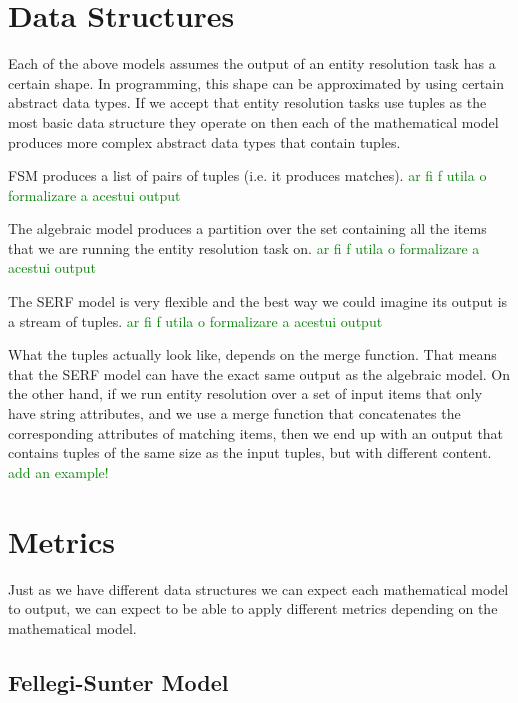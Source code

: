 \documentclass[11pt]{article}
\begin{document}
    \section{Data Structures}\label{section:data-structures}

    Each of the above models assumes the output of an entity resolution task has a certain shape. In programming, this shape can be approximated by using certain abstract data types. If we accept that entity resolution tasks use tuples as the most basic data structure they operate on then each of the mathematical model produces more complex abstract data types that contain tuples.

    FSM produces a list of pairs of tuples (i.e. it produces matches). 
    \textcolor{green}{ar fi f utila o formalizare a acestui output}

    The algebraic model produces a partition over the set containing all the items that we are running the entity resolution task on.
    \textcolor{green}{ar fi f utila o formalizare a acestui output}

    The SERF model is very flexible and the best way we could imagine its output is a stream of tuples. 
    \textcolor{green}{ar fi f utila o formalizare a acestui output}

    What the tuples actually look like, depends on the merge function. That means that the SERF model can have the exact same output as the algebraic model. On the other hand, if we run entity resolution over a set of input items that only have string attributes, and we use a merge function that concatenates the corresponding attributes of matching items, then we end up with an output that contains tuples of the same size as the input tuples, but with different content.
    \textcolor{green}{add an example!}

    \section{Metrics}\label{section:metrics}
    
    Just as we have different data structures we can expect each mathematical model to output, we can expect to be able
    to apply different metrics depending on the mathematical model.

    \subsection[fsm]{Fellegi-Sunter Model}\label{subsec:fellegi-sunter-model}
    
\end{document}
